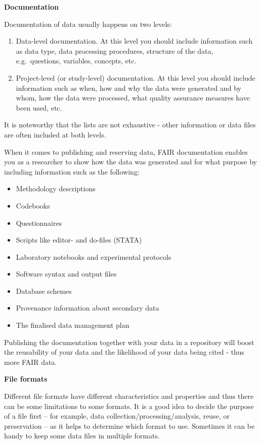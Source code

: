 \documentclass[
]{book}
\providecommand{\tightlist}{%
  \setlength{\itemsep}{0pt}\setlength{\parskip}{0pt}}
\begin{document}
\textbf{Documentation}

Documentation of data usually happens on two levels:

\begin{enumerate}
\def\labelenumi{\arabic{enumi}.}
\tightlist
\item
  Data-level documentation. At this level you should include information such as data type, data processing procedures, structure of the data, e.g.~questions, variables, concepts, etc.
\item
  Project-level (or study-level) documentation. At this level you should include information such as when, how and why the data were generated and by whom, how the data were processed, what quality assurance measures have been used, etc.
\end{enumerate}

It is noteworthy that the lists are not exhaustive - other information or data files are often included at both levels.

When it comes to publishing and reserving data, FAIR documentation enables you as a researcher to show how the data was generated and for what purpose by including information such as the following:

\begin{itemize}
\tightlist
\item
  Methodology descriptions
\item
  Codebooks
\item
  Questionnaires
\item
  Scripts like editor- and do-files (STATA)
\item
  Laboratory notebooks and experimental protocols
\item
  Software syntax and output files
\item
  Database schemes
\item
  Provenance information about secondary data
\item
  The finalised data management plan
\end{itemize}

Publishing the documentation together with your data in a repository will boost the reusability of your data and the likelihood of your data being cited - thus more FAIR data.

\textbf{File formats}

Different file formats have different characteristics and properties and thus there can be some limitations to some formats. It is a good idea to decide the purpose of a file first -- for example, data collection/processing/analysis, reuse, or preservation -- as it helps to determine which format to use. Sometimes it can be handy to keep some data files in multiple formats.
\end{document}
